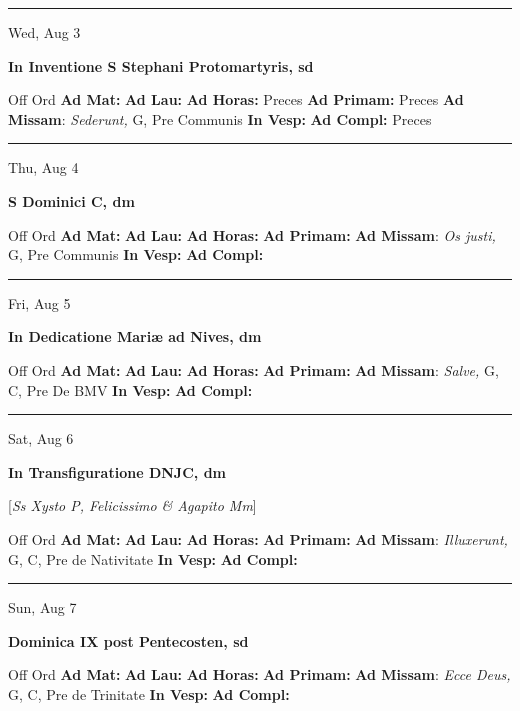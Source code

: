 \documentclass[letterpaper, 10pt]{article}
\begin{document}
\hrule
\begin{center}
Wed, Aug 3
\end{center}\textbf{ \large In Inventione S Stephani Protomartyris, \textnormal{\normalsize sd}}
\begin{justify}
Off Ord
\textbf{Ad Mat: }
\textbf{Ad Lau: }
\textbf{Ad Horas: }Preces
\textbf{Ad Primam: }Preces
\textbf{Ad Missam}: \textit{Sederunt,} G, Pre Communis
\textbf{In Vesp: }
\textbf{Ad Compl: }Preces\end{justify}



\hrule
\begin{center}
Thu, Aug 4
\end{center}\textbf{ \large S Dominici C, \textnormal{\normalsize dm}}
\begin{justify}
Off Ord
\textbf{Ad Mat: }
\textbf{Ad Lau: }
\textbf{Ad Horas: }
\textbf{Ad Primam: }
\textbf{Ad Missam}: \textit{Os justi,} G, Pre Communis
\textbf{In Vesp: }
\textbf{Ad Compl: }\end{justify}



\hrule
\begin{center}
Fri, Aug 5
\end{center}\textbf{ \large In Dedicatione Mariæ ad Nives, \textnormal{\normalsize dm}}
\begin{justify}
Off Ord
\textbf{Ad Mat: }
\textbf{Ad Lau: }
\textbf{Ad Horas: }
\textbf{Ad Primam: }
\textbf{Ad Missam}: \textit{Salve,} G, C, Pre De BMV
\textbf{In Vesp: }
\textbf{Ad Compl: }\end{justify}



\hrule
\begin{center}
Sat, Aug 6
\end{center}\textbf{ \large In Transfiguratione DNJC, \textnormal{\normalsize dm}}

[\textit{Ss Xysto P, Felicissimo \& Agapito Mm}]
\begin{justify}
Off Ord
\textbf{Ad Mat: }
\textbf{Ad Lau: }
\textbf{Ad Horas: }
\textbf{Ad Primam: }
\textbf{Ad Missam}: \textit{Illuxerunt,} G, C, Pre de Nativitate
\textbf{In Vesp: }
\textbf{Ad Compl: }\end{justify}



\hrule
\begin{center}
Sun, Aug 7
\end{center}\textbf{ \large Dominica IX post Pentecosten, \textnormal{\normalsize sd}}
\begin{justify}
Off Ord
\textbf{Ad Mat: }
\textbf{Ad Lau: }
\textbf{Ad Horas: }
\textbf{Ad Primam: }
\textbf{Ad Missam}: \textit{Ecce Deus,} G, C, Pre de Trinitate
\textbf{In Vesp: }
\textbf{Ad Compl: }\end{justify}
\end{document}
